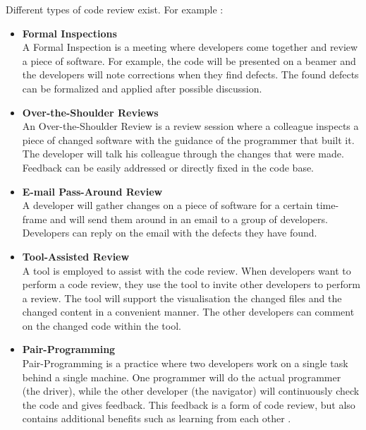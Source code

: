 Different types of code review exist. For example \autocite[23--38]{cohen2006best}:
\begin{itemize}
\setlength\itemsep{0em}
\item \textbf{Formal Inspections} \autocite[23]{cohen2006best}\\
A Formal Inspection is a meeting where developers come together and review a piece of software.
For example, the code will be presented on a beamer and the developers will note corrections when they find defects.
The found defects can be formalized and applied after possible discussion.
\item \textbf{Over-the-Shoulder Reviews} \autocite[26]{cohen2006best}\\
An Over-the-Shoulder Review is a review session where a colleague inspects a piece of changed software with the guidance of the programmer that built it.
The developer will talk his colleague through the changes that were made.
Feedback can be easily addressed or directly fixed in the code base.
\item \textbf{E-mail Pass-Around Review} \autocite[30]{cohen2006best}\\
A developer will gather changes on a piece of software for a certain time-frame and will send them around in an email to a group of developers.
Developers can reply on the email with the defects they have found.
\item \textbf{Tool-Assisted Review} \autocite[34]{cohen2006best}\\
A tool is employed to assist with the code review.
When developers want to perform a code review, they use the tool to invite other developers to perform a review.
The tool will support the visualisation the changed files and the changed content in a convenient manner.
The other developers can comment on the changed code within the tool.
\item \textbf{Pair-Programming} \autocite[37]{cohen2006best}\\
Pair-Programming is a practice where two developers work on a single task behind a single machine.
One programmer will do the actual programmer (the driver), while the other developer (the navigator) will continuously check the code and gives feedback.
This feedback is a form of code review, but also contains additional benefits such as learning from each other \autocite{cockburn2000costs}.
\end{itemize}

